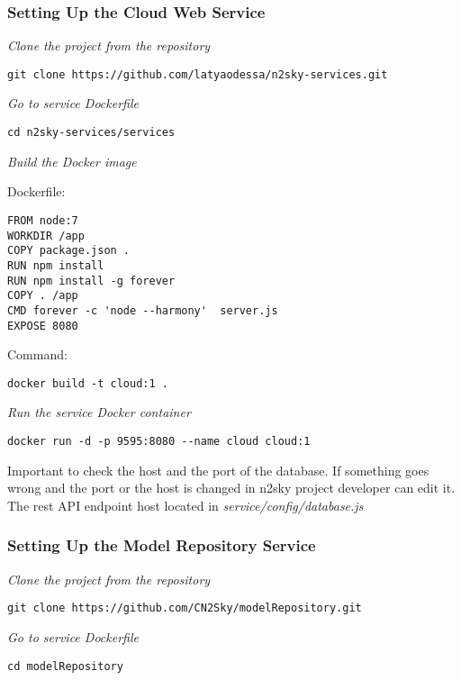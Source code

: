 \subsubsection{Setting Up the Cloud Web Service}\label{cloud setup}

\emph{Clone the project from the repository}
 \begin{lstlisting}
git clone https://github.com/latyaodessa/n2sky-services.git 
\end{lstlisting}

\emph{Go to service Dockerfile}
 \begin{lstlisting}
cd n2sky-services/services
\end{lstlisting}

\emph{Build the Docker image}

Dockerfile:
 \begin{lstlisting}
FROM node:7
WORKDIR /app
COPY package.json .
RUN npm install
RUN npm install -g forever
COPY . /app
CMD forever -c 'node --harmony'  server.js
EXPOSE 8080
\end{lstlisting}

Command: 
 \begin{lstlisting}
docker build -t cloud:1 .
\end{lstlisting}


\emph{Run the service Docker container}
 \begin{lstlisting}
docker run -d -p 9595:8080 --name cloud cloud:1
\end{lstlisting}


Important to check the host and the port of the database. 
If something goes wrong and the port or the host is changed in n2sky project developer can edit it.
The rest API endpoint host located in \emph{service/config/database.js}

\subsubsection{Setting Up the Model Repository Service}\label{model setup}

\emph{Clone the project from the repository}
 \begin{lstlisting}
git clone https://github.com/CN2Sky/modelRepository.git
\end{lstlisting}

\emph{Go to service Dockerfile}
 \begin{lstlisting}
cd modelRepository
\end{lstlisting}


